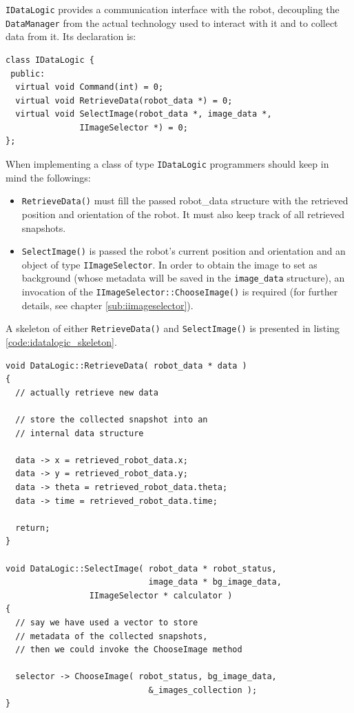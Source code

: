 \texttt{IDataLogic} provides a communication interface 
with the robot, decoupling the \texttt{DataManager} 
from the actual technology used to interact with it 
and to collect data from it. Its declaration is: 
\begin{lstlisting}[caption={\texttt{IDataLogic} declaration}, label={code:idatalogic}, frame=trBL]
class IDataLogic {
 public:
  virtual void Command(int) = 0;
  virtual void RetrieveData(robot_data *) = 0;
  virtual void SelectImage(robot_data *, image_data *,
			   IImageSelector *) = 0;
};
\end{lstlisting}
%
When implementing a class of type \texttt{IDataLogic}
programmers should keep in mind the followings:
\begin{itemize}
  \item \texttt{RetrieveData()} must fill the passed 
    robot\_data structure with the retrieved position and
    orientation of the robot. It must also keep track of 
    all retrieved snapshots.
  \item \texttt{SelectImage()} is passed the robot's current 
    position and orientation and an object of type 
    \texttt{IImageSelector}. In order to obtain the image 
    to set as background (whose metadata will be saved 
    in the \texttt{image\_data} structure), an 
    invocation of the \texttt{IImageSelector::ChooseImage()}
    is required (for further details, see chapter
    \ref{sub:iimageselector}).
\end{itemize}
%
A skeleton of either \texttt{RetrieveData()} and 
\texttt{SelectImage()} is presented in listing 
\ref{code:idatalogic_skeleton}.
%
\begin{lstlisting}[caption={\texttt{IDataLogic} methods skeleton}, label={code:idatalogic_skeleton}, frame=trBL]
void DataLogic::RetrieveData( robot_data * data )
{
  // actually retrieve new data

  // store the collected snapshot into an
  // internal data structure
  
  data -> x = retrieved_robot_data.x;
  data -> y = retrieved_robot_data.y;
  data -> theta = retrieved_robot_data.theta; 
  data -> time = retrieved_robot_data.time;

  return;
}

void DataLogic::SelectImage( robot_data * robot_status, 
                             image_data * bg_image_data,
			     IImageSelector * calculator )
{
  // say we have used a vector to store 
  // metadata of the collected snapshots, 
  // then we could invoke the ChooseImage method

  selector -> ChooseImage( robot_status, bg_image_data, 
                             &_images_collection );
}
\end{lstlisting}
%

